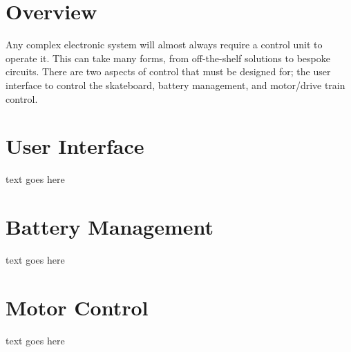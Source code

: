 \documentclass{article}
\begin{document}
\section{Overview}
Any complex electronic system will almost always require a control unit to operate it. This can take many forms, from off-the-shelf solutions to bespoke circuits. There are two aspects of control that must be designed for; the user interface to control the skateboard, battery management, and motor/drive train control.
\section{User Interface}
text goes here
\section{Battery Management}
text goes here
\section{Motor Control}
text goes here
\end{document}
